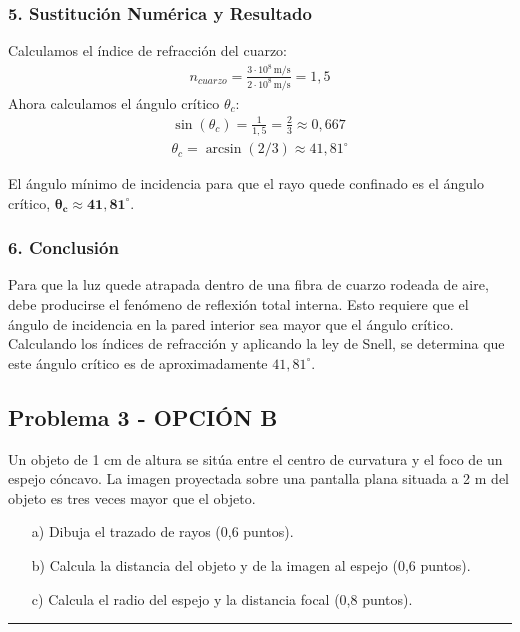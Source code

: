 \subsubsection*{5. Sustitución Numérica y Resultado}
Calculamos el índice de refracción del cuarzo:
\begin{gather}
    n_{cuarzo} = \frac{3 \cdot 10^8 \, \text{m/s}}{2 \cdot 10^8 \, \text{m/s}} = 1,5
\end{gather}
Ahora calculamos el ángulo crítico $\theta_c$:
\begin{gather}
    \sin(\theta_c) = \frac{1}{1,5} = \frac{2}{3} \approx 0,667 \\
    \theta_c = \arcsin(2/3) \approx 41,81^\circ
\end{gather}
\begin{cajaresultado}
El ángulo mínimo de incidencia para que el rayo quede confinado es el ángulo crítico, $\boldsymbol{\theta_c \approx 41,81^\circ}$.
\end{cajaresultado}

\subsubsection*{6. Conclusión}
\begin{cajaconclusion}
Para que la luz quede atrapada dentro de una fibra de cuarzo rodeada de aire, debe producirse el fenómeno de reflexión total interna. Esto requiere que el ángulo de incidencia en la pared interior sea mayor que el ángulo crítico. Calculando los índices de refracción y aplicando la ley de Snell, se determina que este ángulo crítico es de aproximadamente $41,81^\circ$.
\end{cajaconclusion}

\newpage

\subsection{Problema 3 - OPCIÓN B}
\label{subsec:3B_2010_jun_ord}
\begin{cajaenunciado}
Un objeto de 1 cm de altura se sitúa entre el centro de curvatura y el foco de un espejo cóncavo. La imagen proyectada sobre una pantalla plana situada a 2 m del objeto es tres veces mayor que el objeto.
\begin{enumerate}
    \item[a)] Dibuja el trazado de rayos (0,6 puntos).
    \item[b)] Calcula la distancia del objeto y de la imagen al espejo (0,6 puntos).
    \item[c)] Calcula el radio del espejo y la distancia focal (0,8 puntos).
\end{enumerate}
\end{cajaenunciado}
\hrule


